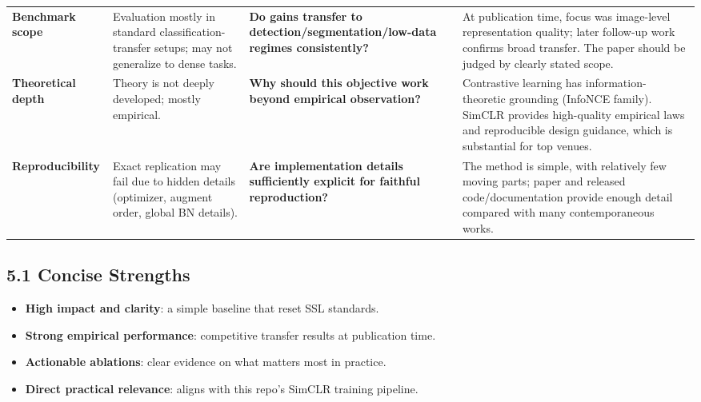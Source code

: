 \documentclass[11pt,a4paper]{article}
\begin{document}
\begin{longtable}{p{}p{}p{}p{}}
\textbf{Benchmark scope} &
Evaluation mostly in standard classification-transfer setups; may not generalize to dense tasks. &
\textbf{Do gains transfer to detection/segmentation/low-data regimes consistently?} &
At publication time, focus was image-level representation quality; later follow-up work confirms broad transfer. The paper should be judged by clearly stated scope. \\

\textbf{Theoretical depth} &
Theory is not deeply developed; mostly empirical. &
\textbf{Why should this objective work beyond empirical observation?} &
Contrastive learning has information-theoretic grounding (InfoNCE family). SimCLR provides high-quality empirical laws and reproducible design guidance, which is substantial for top venues. \\

\textbf{Reproducibility} &
Exact replication may fail due to hidden details (optimizer, augment order, global BN details). &
\textbf{Are implementation details sufficiently explicit for faithful reproduction?} &
The method is simple, with relatively few moving parts; paper and released code/documentation provide enough detail compared with many contemporaneous works. \\
\bottomrule
\end{longtable}

\subsection*{5.1 Concise Strengths}
\begin{itemize}[leftmargin=1.5em]
    \item \textbf{High impact and clarity}: a simple baseline that reset SSL standards.
    \item \textbf{Strong empirical performance}: competitive transfer results at publication time.
    \item \textbf{Actionable ablations}: clear evidence on what matters most in practice.
    \item \textbf{Direct practical relevance}: aligns with this repo's SimCLR training pipeline.
\end{itemize}
\end{document}
